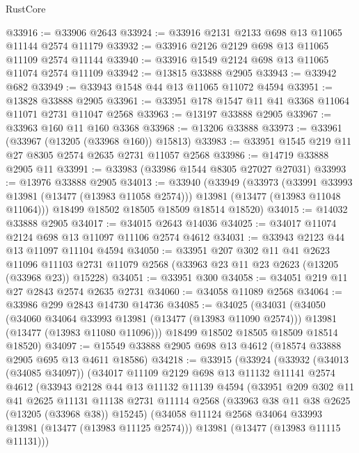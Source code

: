 \begin{lexlean}{RustCore}
\begin{coremodule}
@33916 := @33906 @2643
@33924 := @33916 @2131 @2133 @698 @13 @11065 @11144 @2574 @11179
@33932 := @33916 @2126 @2129 @698 @13 @11065 @11109 @2574 @11144
@33940 := @33916 @1549 @2124 @698 @13 @11065 @11074 @2574 @11109
@33942 := @13815 @33888 @2905
@33943 := @33942 @682
@33949 := @33943 @1548 @44 @13 @11065 @11072 @4594
@33951 := @13828 @33888 @2905
@33961 := @33951 @178 @1547 @11 @41 @3368 @11064 @11071 @2731 @11047 @2568
@33963 := @13197 @33888 @2905
@33967 := @33963 @160 @11 @160 @3368
@33968 := @13206 @33888
@33973 := @33961 (@33967 (@13205 (@33968 @160)) @15813)
@33983 := @33951 @1545 @219 @11 @27 @8305 @2574 @2635 @2731 @11057 @2568
@33986 := @14719 @33888 @2905 @11
@33991 := @33983 (@33986 @1544 @8305 @27027 @27031)
@33993 := @13976 @33888 @2905
@34013 := @33940
    (@33949
      (@33973
        (@33991 @33993 @13981 (@13477 (@13983 @11058 @2574)))
        @13981
        (@13477 (@13983 @11048 @11064)))
      @18499
      @18502
      @18505
      @18509
      @18514
      @18520)
@34015 := @14032 @33888 @2905
@34017 := @34015 @2643 @14036
@34025 := @34017 @11074 @2124 @698 @13 @11097 @11106 @2574 @4612
@34031 := @33943 @2123 @44 @13 @11097 @11104 @4594
@34050 := @33951
    @207
    @302
    @11
    @41
    @2623
    @11096
    @11103
    @2731
    @11079
    @2568
    (@33963 @23 @11 @23 @2623 (@13205 (@33968 @23)) @15228)
@34051 := @33951 @300
@34058 := @34051 @219 @11 @27 @2843 @2574 @2635 @2731
@34060 := @34058 @11089 @2568
@34064 := @33986 @299 @2843 @14730 @14736
@34085 := @34025
    (@34031
      (@34050
        (@34060 @34064 @33993 @13981 (@13477 (@13983 @11090 @2574)))
        @13981
        (@13477 (@13983 @11080 @11096)))
      @18499
      @18502
      @18505
      @18509
      @18514
      @18520)
@34097 := @15549 @33888 @2905 @698 @13 @4612 (@18574 @33888 @2905 @695 @13 @4611 @18586)
@34218 := @33915
    (@33924
      (@33932
        (@34013 (@34085 @34097))
        (@34017
          @11109
          @2129
          @698
          @13
          @11132
          @11141
          @2574
          @4612
          (@33943
            @2128
            @44
            @13
            @11132
            @11139
            @4594
            (@33951
              @209
              @302
              @11
              @41
              @2625
              @11131
              @11138
              @2731
              @11114
              @2568
              (@33963 @38 @11 @38 @2625 (@13205 (@33968 @38)) @15245)
              (@34058 @11124 @2568 @34064 @33993 @13981 (@13477 (@13983 @11125 @2574)))
              @13981
              (@13477 (@13983 @11115 @11131)))

\end{coremodule}
\end{lexlean}
